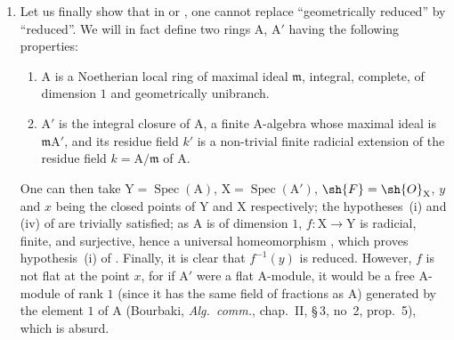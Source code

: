 \begin{remarks}[15.2.4]
\begin{enumerate}[label=(\roman*)]
The only point $x$ of $\mathrm{X}$ above the point $y$ corresponding to the maximal ideal $(s)+(t)$ is such that, as the class $\bar{u}$ of $u$ in $\sh{O}_x/\mathfrak{m}_y\sh{O}_x$ satisfies $\bar{u}^2=0$, $f^{-1}(y)$ is not a reduced $\mathbf{k}(y)$-prescheme.
Here $f$ is a finite morphism , but it is not flat at the point $x$, for if $\sh{O}_x$ were a flat $\sh{O}_y$-module, it would be a free $\sh{O}_y$-module (Bourbaki, \emph{Alg.\ comm.}, chap.~II, \S\,3, no~2, prop.~5), which is absurd.
  \item Let us finally show that in  or , one cannot replace ``geometrically reduced'' by ``reduced''.
We will in fact define two rings $\mathrm{A}$, $\mathrm{A}'$ having the following properties:
\begin{enumerate}[label=\arabic*)]
  \item $\mathrm{A}$ is a Noetherian local ring of maximal ideal $\mathfrak{m}$, integral, complete, of dimension $1$ and geometrically unibranch.
  \item $\mathrm{A}'$ is the integral closure of $\mathrm{A}$, a finite $\mathrm{A}$-algebra whose maximal ideal is $\mathfrak{m}\mathrm{A}'$, and its residue field $k'$ is a non-trivial finite radicial extension of the residue field $k=\mathrm{A}/\mathfrak{m}$ of $\mathrm{A}$.
\end{enumerate}
One can then take $\mathrm{Y}=\operatorname{Spec}(\mathrm{A})$, $\mathrm{X}=\operatorname{Spec}(\mathrm{A}')$, $\sh{F}=\sh{O}_\mathrm{X}$, $y$ and $x$ being the closed points of $\mathrm{Y}$ and $\mathrm{X}$ respectively; the hypotheses~(i) and (iv) of  are trivially satisfied; as $\mathrm{A}$ is of dimension $1$, $f:\mathrm{X}\to\mathrm{Y}$ is radicial, finite, and surjective, hence a universal homeomorphism , which proves hypothesis~(i) of .
Finally, it is clear that $f^{-1}(y)$ is reduced.
However, $f$ is not flat at the point $x$, for if $\mathrm{A}'$ were a flat $\mathrm{A}$-module, it would be a free $\mathrm{A}$-module of rank $1$ (since it has the same field of fractions as $\mathrm{A}$) generated by the element $1$ of $\mathrm{A}$ (Bourbaki, \emph{Alg.\ comm.}, chap.~II, \S\,3, no~2, prop.~5), which is absurd.


\end{enumerate}
\end{remarks}
